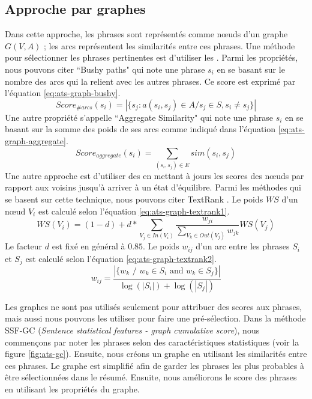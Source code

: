 \documentclass{KodeBook}
\begin{document}
\subsection{Approche par graphes}

Dans cette approche, les phrases sont représentés comme nœuds d'un graphe $G(V, A)$ ; les arcs représentent les similarités entre ces phrases. 
Une méthode pour sélectionner les phrases pertinentes est d'utiliser les . 
Parmi les propriétés, nous pouvons citer ``Bushy paths" qui note une phrase $s_i$ en se basant sur le nombre des arcs qui la relient avec les autres phrases.
Ce score est exprimé par l'équation \ref{eq:ats-graph-bushy}.
\begin{equation}\label{eq:ats-graph-bushy}
Score_{\#arcs}(s_i) = |\{ s_j : a(s_i, s_j) \in A / s_j \in S, s_i \neq s_j \}|
\end{equation}
Une autre propriété s'appelle ``Aggregate Similarity" qui note une phrase $s_i$ en se basant sur la somme des poids de ses arcs comme indiqué dans l'équation \ref{eq:ats-graph-aggregate}.
\begin{equation}\label{eq:ats-graph-aggregate}
Score_{aggregate}(s_i) = \sum\limits_{(s_i, s_j) \in E} sim(s_i, s_j)
\end{equation}
Une autre approche est d'utiliser des  en mettant à jours les scores des nœuds par rapport aux voisins jusqu'à arriver à un état d'équilibre. 
Parmi les méthodes qui se basent sur cette technique, nous pouvons citer TextRank \cite{04-mihalcea-tarau}. 
Le poids $WS$ d'un nœud $V_i$ est calculé selon l'équation \ref{eq:ats-graph-textrank1}.
\begin{equation}\label{eq:ats-graph-textrank1}
WS(V_i) = ( 1 - d) + d * \sum\limits_{V_j \in In(V_i)} \frac{w_{ji}}{\sum\limits_{V_k \in Out(V_j)} w_{jk}} WS(V_j)
\end{equation}
Le facteur $ d $ est fixé en général à $ 0.85 $.
Le poids $w_{ij}$ d'un arc entre les phrases $S_i$ et $S_j$ est calculé selon l'équation \ref{eq:ats-graph-textrank2}.
\begin{equation}\label{eq:ats-graph-textrank2}
w_{ij} = \frac{|\{w_k \text{ / } w_k \in S_i \text{ and } w_k \in S_j\}|}{\log(|S_i|) + \log(|S_j|)}
\end{equation}

Les graphes ne sont pas utilisés seulement pour attribuer des scores aux phrases, mais aussi nous pouvons les utiliser pour faire une pré-sélection.
Dans la méthode SSF-GC (\textit{Sentence statistical features - graph cumulative score})\cite{21-aries-al}, nous commençons par noter les phrases selon des caractéristiques statistiques (voir la figure \ref{fig:ats-gc}). 
Ensuite, nous créons un graphe en utilisant les similarités entre ces phrases. 
Le graphe est simplifié afin de garder les phrases les plus probables à être sélectionnées dans le résumé. 
Ensuite, nous améliorons le score des phrases en utilisant les propriétés du graphe.
\end{document}
